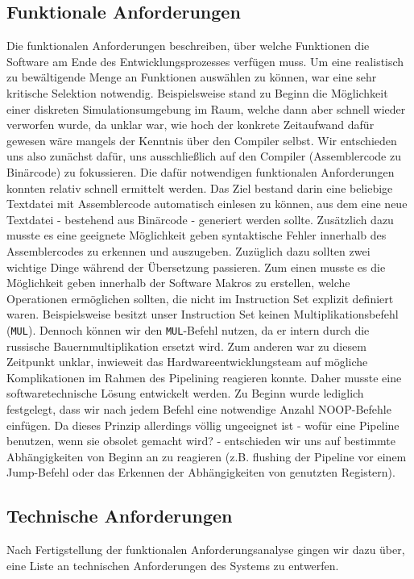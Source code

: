 \documentclass[paper=a4,fontsize=12pt]{scrreprt}
\begin{document}
\subsection{Funktionale Anforderungen}
Die funktionalen Anforderungen beschreiben, über welche Funktionen die Software am Ende des Entwicklungsprozesses verfügen muss. Um eine realistisch zu bewältigende Menge an Funktionen auswählen zu können, war eine sehr kritische Selektion notwendig. Beispielsweise stand zu Beginn die Möglichkeit einer diskreten Simulationsumgebung im Raum, welche dann aber schnell wieder verworfen wurde, da unklar war, wie hoch der konkrete Zeitaufwand dafür gewesen wäre mangels der Kenntnis über den Compiler selbst. Wir entschieden uns also zunächst dafür, uns ausschließlich auf den Compiler (Assemblercode zu Binärcode) zu fokussieren.
Die dafür notwendigen funktionalen Anforderungen konnten relativ schnell ermittelt werden. Das Ziel bestand darin eine beliebige Textdatei mit Assemblercode automatisch einlesen zu können, aus dem eine neue Textdatei - bestehend aus Binärcode - generiert werden sollte. Zusätzlich dazu musste es eine geeignete Möglichkeit geben syntaktische Fehler innerhalb des Assemblercodes zu erkennen und auszugeben. Zuzüglich dazu sollten zwei wichtige Dinge während der Übersetzung passieren. Zum einen musste es die Möglichkeit geben innerhalb der Software Makros zu erstellen, welche Operationen ermöglichen sollten, die nicht im Instruction Set explizit definiert waren. Beispielsweise besitzt unser Instruction Set keinen Multiplikationsbefehl (\texttt{MUL}). Dennoch können wir den \texttt{MUL}-Befehl nutzen, da er intern durch die russische Bauernmultiplikation ersetzt wird. Zum anderen war zu diesem Zeitpunkt unklar, inwieweit das Hardwareentwicklungsteam auf mögliche Komplikationen im Rahmen des Pipelining reagieren konnte. Daher musste eine softwaretechnische Lösung entwickelt werden. Zu Beginn wurde lediglich festgelegt, dass wir nach jedem Befehl eine notwendige Anzahl NOOP-Befehle einfügen. Da dieses Prinzip allerdings völlig ungeeignet ist - wofür eine Pipeline benutzen, wenn sie obsolet gemacht wird? - entschieden wir uns auf bestimmte Abhängigkeiten von Beginn an zu reagieren (z.B. flushing der Pipeline vor einem Jump-Befehl oder das Erkennen der Abhängigkeiten von genutzten Registern).

\subsection{Technische Anforderungen}
Nach Fertigstellung der funktionalen Anforderungsanalyse gingen wir dazu über, eine Liste an technischen Anforderungen des Systems zu entwerfen.
\end{document}
